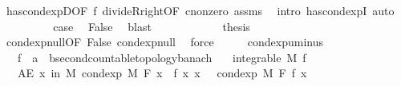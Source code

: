 \begin{isabellebody}
\ has{\isacharunderscore}{\kern0pt}cond{\isacharunderscore}{\kern0pt}expD{\isacharbrackleft}{\kern0pt}OF\ f{\isacharprime}{\kern0pt}{\isacharbrackright}{\kern0pt}\ divideR{\isacharunderscore}{\kern0pt}right{\isacharbrackleft}{\kern0pt}OF\ c{\isacharunderscore}{\kern0pt}nonzero{\isacharbrackright}{\kern0pt}\ assms\ \isamarkupfalse%
\ {\isacharparenleft}{\kern0pt}intro\ has{\isacharunderscore}{\kern0pt}cond{\isacharunderscore}{\kern0pt}expI{\isacharprime}{\kern0pt}{\isacharcomma}{\kern0pt}\ auto{\isacharparenright}{\kern0pt}\isanewline
\ \ \ \ \ \ \isamarkupfalse%
\ \isamarkupfalse%
\ {\isacharquery}{\kern0pt}case\ \isamarkupfalse%
\ False\ \isamarkupfalse%
\ blast\isanewline
\ \ \ \ \isamarkupfalse%
\isanewline
\ \ \ \ \isamarkupfalse%
\ \isamarkupfalse%
\ {\isacharquery}{\kern0pt}thesis\ \isamarkupfalse%
\ cond{\isacharunderscore}{\kern0pt}exp{\isacharunderscore}{\kern0pt}null{\isacharbrackleft}{\kern0pt}OF\ False{\isacharbrackright}{\kern0pt}\ cond{\isacharunderscore}{\kern0pt}exp{\isacharunderscore}{\kern0pt}null\ \isamarkupfalse%
\ force\isanewline
\ \ \isamarkupfalse%
\ \isanewline
{}\isamarkupfalse%
%
\endisatagproof
{\isafoldproof}%
%
\isadelimproof
\isanewline
%
\endisadelimproof
\isanewline
{}\isamarkupfalse%
\ cond{\isacharunderscore}{\kern0pt}exp{\isacharunderscore}{\kern0pt}uminus{\isacharcolon}{\kern0pt}\isanewline
\ \ \ f\ {\isacharcolon}{\kern0pt}{\isacharcolon}{\kern0pt}\ {\isachardoublequoteopen}{\isacharprime}{\kern0pt}a\ {\isasymRightarrow}\ {\isacharprime}{\kern0pt}b{\isacharcolon}{\kern0pt}{\isacharcolon}{\kern0pt}{\isacharbraceleft}{\kern0pt}second{\isacharunderscore}{\kern0pt}countable{\isacharunderscore}{\kern0pt}topology{\isacharcomma}{\kern0pt}banach{\isacharbraceright}{\kern0pt}{\isachardoublequoteclose}\isanewline
\ \ \ {\isachardoublequoteopen}integrable\ M\ f{\isachardoublequoteclose}\isanewline
\ \ \ {\isachardoublequoteopen}AE\ x\ in\ M{\isachardot}{\kern0pt}\ cond{\isacharunderscore}{\kern0pt}exp\ M\ F\ {\isacharparenleft}{\kern0pt}{\isasymlambda}x{\isachardot}{\kern0pt}\ {\isacharminus}{\kern0pt}\ f\ x{\isacharparenright}{\kern0pt}\ x\ {\isacharequal}{\kern0pt}\ {\isacharminus}{\kern0pt}\ cond{\isacharunderscore}{\kern0pt}exp\ M\ F\ f\ x{\isachardoublequoteclose}\isanewline
%
\isadelimproof
\ \ %
\endisadelimproof
%
\isatagproof
{}\isamarkupfalse%

\end{isabellebody}
